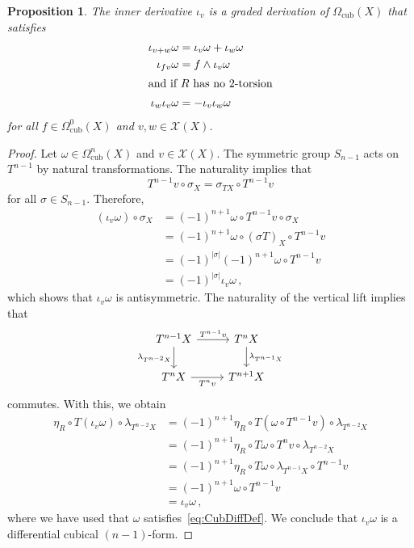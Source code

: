\documentclass[12pt,reqno, a4paper]{amsart}
\numberwithin{equation}{section}
\theoremstyle{plain}
\newtheorem{Proposition}[Theorem]{Proposition}
\theoremstyle{definition}
\theoremstyle{remark}
\newcommand{\calX}{\mathcal{X}}
\newcommand{\Val}{\eta}
\begin{document}
\begin{Proposition}
\label{prop:InnDerProp}
The inner derivative $\iota_v$ is a graded derivation of $\Omega_\mathrm{cub}(X)$ that satisfies
\begin{align}
\label{eq:InnDerProp03}
  \iota_{v+w} \omega
  &= \iota_v \omega + \iota_w \omega
  \\
\label{eq:InnDerProp02}
  \iota_{fv} \omega
  &= f \wedge \iota_v \omega
  \\
\intertext{and if $R$ has no 2-torsion}
\label{eq:InnDerProp01}
  \iota_w \iota_v \omega
  &= - \iota_v \iota_w \omega
\end{align}
for all $f \in \Omega^0_\mathrm{cub}(X)$ and $v, w \in \calX(X)$.
\end{Proposition}

\begin{proof}
Let $\omega \in \Omega^n_\mathrm{cub}(X)$ and $v \in \calX(X)$. The symmetric group $S_{n-1}$ acts on $T^{n-1}$ by natural transformations. The naturality implies that
\begin{equation}
\label{eq:SigmaNatTv}
  T^{n-1}v \circ \sigma_X
  =
  \sigma_{TX} \circ T^{n-1}v
\end{equation}
for all $\sigma \in S_{n-1}$. Therefore,
\begin{equation*}
\begin{split}
  (\iota_v \omega) \circ \sigma_X
  &= (-1)^{n+1} \omega \circ T^{n-1}v \circ \sigma_X
  \\
  &= (-1)^{n+1} \omega \circ (\sigma T)_X \circ T^{n-1}v
  \\
  &= (-1)^{|\sigma|}(-1)^{n+1} \omega \circ T^{n-1}v
  \\
  &= (-1)^{|\sigma|} \iota_v \omega
  \,,
\end{split}
\end{equation*}
which shows that $\iota_v \omega$ is antisymmetric. The naturality of the vertical lift implies that
\begin{equation*}
\begin{tikzcd}
T^{n-1} X
\ar[d, "\lambda_{T^{n-2}X}"']
\ar[r, "T^{n-1}v"]
&
T^n X
\ar[d, "\lambda_{T^{n-1}X}"]
\\
T^n X
\ar[r, "T^n v"']
&
T^{n+1} X
\end{tikzcd}
\end{equation*}
commutes. With this, we obtain
\begin{equation*}
\begin{split}
  \Val_R \circ T(\iota_v \omega) \circ \lambda_{T^{n-2}X}
  &=
  (-1)^{n+1}\Val_R \circ T(\omega \circ T^{n-1} v) \circ \lambda_{T^{n-2}X}
  \\
  &=
  (-1)^{n+1}\Val_R \circ T\omega \circ T^n v \circ \lambda_{T^{n-2}X}
  \\
  &=
  (-1)^{n+1}\Val_R \circ T\omega \circ \lambda_{T^{n-1}X} \circ T^{n-1} v
  \\
  &=
  (-1)^{n+1}\omega \circ T^{n-1} v
  \\
  &=
  \iota_v \omega
  \,,
\end{split}
\end{equation*}
where we have used that $\omega$ satisfies~\eqref{eq:CubDiffDef}. We conclude that $\iota_v \omega$ is a differential cubical $(n-1)$-form.


\end{proof}
\end{document}

